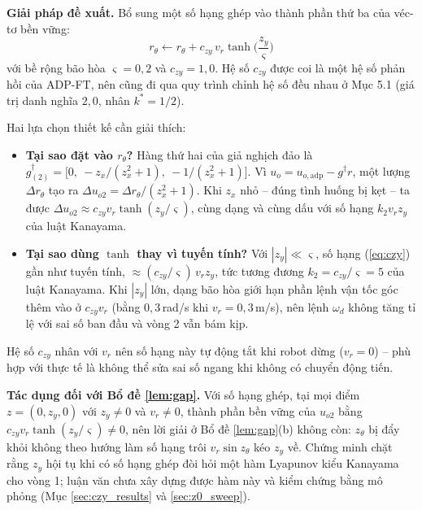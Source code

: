 \documentclass[12pt,a4paper]{article}
\begin{document}
\textbf{Giải pháp đề xuất.} Bổ sung một số hạng ghép vào thành phần thứ ba của véc-tơ bền vững:
\begin{equation}\label{eq:czy}
    r_\theta \leftarrow r_\theta + c_{zy}\, v_r \tanh\!\Big(\frac{z_y}{\varsigma}\Big)
\end{equation}
với bề rộng bão hòa $\varsigma = 0{,}2$ và $c_{zy} = 1{,}0$. Hệ số $c_{zy}$ được coi là một hệ số phản hồi của ADP-FT, nên cũng đi qua quy trình chỉnh hệ số đều nhau ở Mục 5.1 (giá trị danh nghĩa $2{,}0$, nhân $k^* = 1/2$).

Hai lựa chọn thiết kế cần giải thích:

\begin{itemize}
    \item \textbf{Tại sao đặt vào $r_\theta$?} Hàng thứ hai của giả nghịch đảo là $g^\dagger_{(2)} = \big[0,\ -z_x/(z_x^2+1),\ -1/(z_x^2+1)\big]$. Vì $u_o = u_{o,\text{adp}} - g^\dagger r$, một lượng $\Delta r_\theta$ tạo ra $\Delta u_{o2} = \Delta r_\theta/(z_x^2+1)$. Khi $z_x$ nhỏ -- đúng tình huống bị kẹt -- ta được $\Delta u_{o2} \approx c_{zy} v_r \tanh(z_y/\varsigma)$, cùng dạng và cùng dấu với số hạng $k_2 v_r z_y$ của luật Kanayama.

    \item \textbf{Tại sao dùng $\tanh$ thay vì tuyến tính?} Với $|z_y| \ll \varsigma$, số hạng (\ref{eq:czy}) gần như tuyến tính, $\approx (c_{zy}/\varsigma)\, v_r z_y$, tức tương đương $k_2 = c_{zy}/\varsigma = 5$ của luật Kanayama. Khi $|z_y|$ lớn, dạng bão hòa giới hạn phần lệnh vận tốc góc thêm vào ở $c_{zy} v_r$ (bằng $0{,}3$\,rad/s khi $v_r = 0{,}3$\,m/s), nên lệnh $\omega_d$ không tăng tỉ lệ với sai số ban đầu và vòng 2 vẫn bám kịp.
\end{itemize}

Hệ số $c_{zy}$ nhân với $v_r$ nên số hạng này tự động tắt khi robot dừng ($v_r = 0$) -- phù hợp với thực tế là không thể sửa sai số ngang khi không có chuyển động tiến.

\textbf{Tác dụng đối với Bổ đề \ref{lem:gap}.} Với số hạng ghép, tại mọi điểm $z = (0, z_y, 0)$ với $z_y \neq 0$ và $v_r \neq 0$, thành phần bền vững của $u_{o2}$ bằng $c_{zy} v_r \tanh(z_y/\varsigma) \neq 0$, nên lời giải ở Bổ đề \ref{lem:gap}(b) không còn: $z_\theta$ bị đẩy khỏi không theo hướng làm số hạng trôi $v_r\sin z_\theta$ kéo $z_y$ về. Chứng minh chặt rằng $z_y$ hội tụ khi có số hạng ghép đòi hỏi một hàm Lyapunov kiểu Kanayama cho vòng 1; luận văn chưa xây dựng được hàm này và kiểm chứng bằng mô phỏng (Mục \ref{sec:czy_results} và \ref{sec:z0_sweep}).
\end{document}
